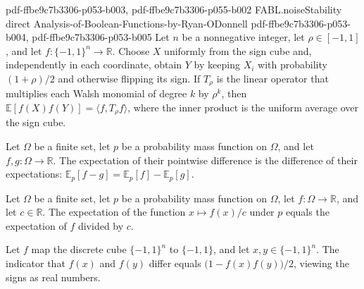 \begin{theorem}
  {pdf-ffbe9c7b3306-p053-b003,
    pdf-ffbe9c7b3306-p055-b002}
\proofstep
  {FABL.noiseStability}
  {direct}
  {Analysis-of-Boolean-Functions-by-Ryan-ODonnell}
  {pdf-ffbe9c7b3306-p053-b004,
    pdf-ffbe9c7b3306-p053-b005}
Let $n$ be a nonnegative integer, let $\rho\in[-1,1]$, and let $f:\{-1,1\}^n\to\mathbb
R$. Choose $X$ uniformly from the sign cube and, independently in each coordinate,
obtain $Y$ by keeping $X_i$ with probability $(1+\rho)/2$ and otherwise flipping its
sign. If $T_\rho$ is the linear operator that multiplies each Walsh monomial of degree
$k$ by $\rho^k$, then $\mathbb E[f(X)f(Y)]=\langle f,T_\rho f\rangle$, where the inner
product is the uniform average over the sign cube.
\end{theorem}

\begin{theorem}
\label{FABL.pmfExpectation_sub}
\leanok
{}
Let $\Omega$ be a finite set, let $p$ be a probability mass function on $\Omega$, and
let $f,g:\Omega\to\mathbb{R}$. The expectation of their pointwise difference is the
difference of their expectations: $\mathbb{E}_p[f-g]=\mathbb{E}_p[f]-\mathbb{E}_p[g]$.
\end{theorem}

\begin{theorem}
\label{FABL.pmfExpectation_div}
\leanok
{}
Let $\Omega$ be a finite set, let $p$ be a probability mass function on $\Omega$, let
$f:\Omega\to\mathbb{R}$, and let $c\in\mathbb{R}$. The expectation of the function
$x\mapsto f(x)/c$ under $p$ equals the expectation of $f$ divided by $c$.
\end{theorem}

\begin{theorem}
\label{FABL.boolean_disagreement_indicator}
\leanok
{}
Let $f$ map the discrete cube $\{-1,1\}^n$ to $\{-1,1\}$, and let $x,y\in\{-1,1\}^n$.
The indicator that $f(x)$ and $f(y)$ differ equals $\bigl(1-f(x)f(y)\bigr)/2$, viewing
the signs as real numbers.
\end{theorem}

